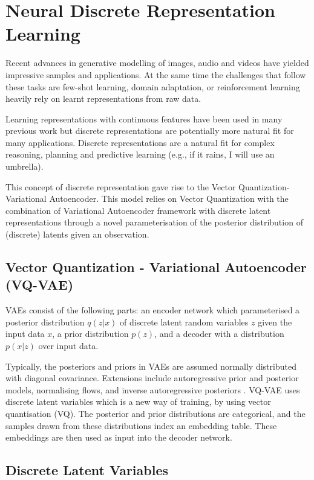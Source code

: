 \section{Neural Discrete Representation Learning}

Recent advances in generative modelling of images, audio and videos have yielded impressive
samples and applications. At the same time the challenges that follow these tasks are few-shot
learning, domain adaptation, or reinforcement learning heavily rely on learnt representations from raw data.

Learning representations with continuous features have been used in many previous 
work but discrete representations  are potentially more natural fit for many applications. 
Discrete representations are a natural fit for complex reasoning, planning and predictive learning
(e.g., if it rains, I will use an umbrella).

This concept of discrete representation gave rise to the Vector Quantization-Variational Autoencoder. 
This model relies on Vector Quantization with the combination of Variational Autoencoder framework with 
discrete latent representations through a novel parameterisation of the posterior distribution of (discrete) 
latents given an observation.~\cite{oord2018neural}

\subsection{Vector Quantization - Variational Autoencoder (VQ-VAE)}

VAEs consist of the following parts: an encoder network which parameterised a posterior  
distribution $q(z|x)$ of discrete latent random variables $z$ given the input data $x$, a prior
distribution $p(z)$, and a decoder with a distribution $p(x|z)$ over input data.

Typically, the posteriors and priors in VAEs are assumed normally distributed with diagonal 
covariance. Extensions include autoregressive prior and posterior models, normalising flows, 
and inverse autoregressive posteriors . VQ-VAE uses discrete latent variables which is  
a new way of training, by using vector quantisation (VQ). The posterior and prior distributions are 
categorical, and the samples drawn from these distributions index an embedding table. These embeddings
are then used as input into the decoder network.

\subsection{Discrete Latent Variables}


